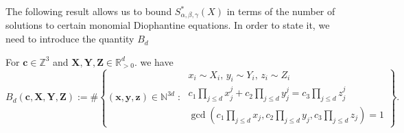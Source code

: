 The following result allows us to bound $S^*_{\alpha,\beta,\gamma}(X)$
in terms of the number of solutions to certain monomial Diophantine equations. In order to state it, we need to introduce the quantity $B_d$
\begin{definition}\label{def:BdDiophantineCount}
For $\mathbf{c}\in \mathbb{Z}^3$ and $\mathbf{X},\mathbf{Y},\mathbf{Z}\in \mathbb{R}_{>0}^{d}$. we have
\begin{equation}\label{eq:Bk}
B_d(\mathbf{c},\mathbf{X},\mathbf{Y},\mathbf{Z}) := \#\left\{(\mathbf{x},\mathbf{y},\mathbf{z})\in \mathbb{N}^{3d}\;:\;
\begin{array}{l}
x_i\sim X_i,\,y_i\sim Y_i,\,z_i\sim Z_i \\
c_1\prod_{j\leq d}x_j^j+c_2\prod_{j\leq d}y_j^j=c_3\prod_{j\leq d}z_j^j\\
\gcd(c_1\prod_{j\leq d}x_j,c_2\prod_{j\leq d}y_j ,
c_3\prod_{j\leq d}z_j)=1
\end{array}
\right\}.
\end{equation}
\end{definition}





